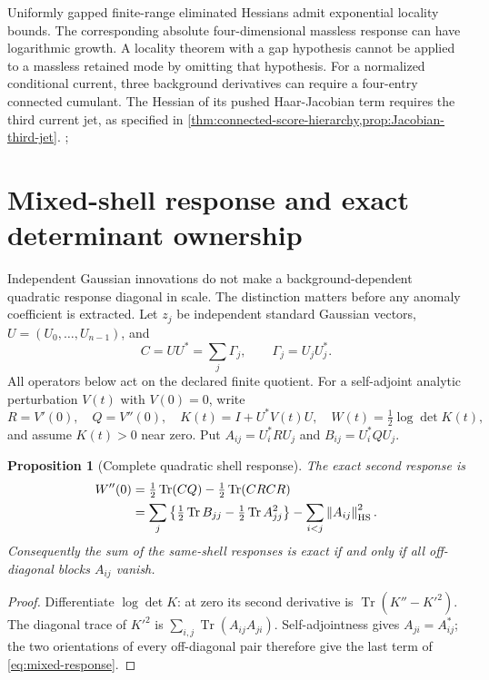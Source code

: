 \documentclass[11pt,oneside,openany]{book}
\newtheorem{proposition}[proposition]{Proposition}
\theoremstyle{definition}
\theoremstyle{remark}
\newcommand{\Tr}{\operatorname{Tr}}
\newcommand{\norm}[1]{\left\lVert#1\right\rVert}
\newcommand{\src}[2]{\cite[#2]{#1}}
\begin{document}
Uniformly gapped finite-range eliminated Hessians admit exponential locality bounds. The corresponding absolute four-dimensional massless response can have logarithmic growth. A locality theorem with a gap hypothesis cannot be applied to a massless retained mode by omitting that hypothesis. For a normalized conditional current, three background derivatives can require a four-entry connected cumulant. The Hessian of its pushed Haar-Jacobian term requires the third current jet, as specified in \cref{thm:connected-score-hierarchy,prop:Jacobian-third-jet}. \src{F7}{V95--V100}; \src{F8}{V60--V61}

\section{Mixed-shell response and exact determinant ownership}
\label{sec:mixed-shells}
Independent Gaussian innovations do not make a background-dependent
quadratic response diagonal in scale. The distinction matters before
any anomaly coefficient is extracted. Let $z_j$ be independent standard
Gaussian vectors, $U=(U_0,\ldots,U_{n-1})$, and
\[
 C=UU^*=\sum_j\Gamma_j,\qquad \Gamma_j=U_jU_j^*.
\]
All operators below act on the declared finite quotient. For a
self-adjoint analytic perturbation $V(t)$ with $V(0)=0$, write
\[
 R=V'(0),\quad Q=V''(0),\quad
 K(t)=I+U^*V(t)U,\quad W(t)=\tfrac12\log\det K(t),
\]
and assume $K(t)>0$ near zero. Put $A_{ij}=U_i^*RU_j$ and
$B_{ij}=U_i^*QU_j$.

\begin{proposition}[Complete quadratic shell response]
\label{prop:mixed-response}
The exact second response is
\begin{align}
 W''(0)&=\tfrac12\Tr(CQ)-\tfrac12\Tr(CRCR)\notag\\
 &=\sum_j\left\{\tfrac12\Tr B_{jj}
                    -\tfrac12\Tr A_{jj}^2\right\}
                -\sum_{i<j}\norm{A_{ij}}_{\mathrm{HS}}^2.
 \label{eq:mixed-response}
\end{align}
Consequently the sum of the same-shell responses is exact if and only
if all off-diagonal blocks $A_{ij}$ vanish.
\end{proposition}
\begin{proof}
Differentiate $\log\det K$: at zero its second derivative is
$\Tr(K''-K'^2)$. The diagonal trace of $K'^2$ is
$\sum_{i,j}\Tr(A_{ij}A_{ji})$. Self-adjointness gives
$A_{ji}=A_{ij}^*$; the two orientations of every off-diagonal pair
therefore give the last term of \cref{eq:mixed-response}.
\end{proof}
\end{document}

